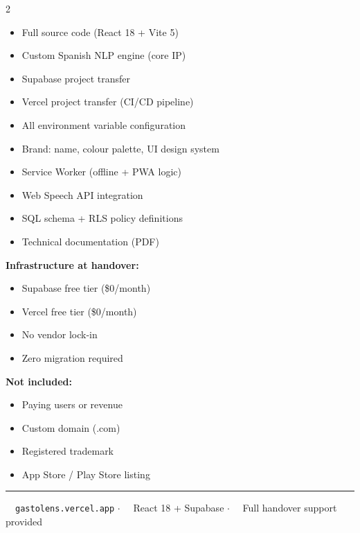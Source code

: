 \documentclass[a4paper,10pt]{article}
\begin{document}
\begin{multicols}{2}

{\small
\begin{itemize}[leftmargin=*,itemsep=2pt,parsep=0pt,topsep=2pt]
  \item[\color{ngreen}\faCheck] Full source code (React 18 + Vite 5)
  \item[\color{ngreen}\faCheck] Custom Spanish NLP engine (core IP)
  \item[\color{ngreen}\faCheck] Supabase project transfer
  \item[\color{ngreen}\faCheck] Vercel project transfer (CI/CD pipeline)
  \item[\color{ngreen}\faCheck] All environment variable configuration
  \item[\color{ngreen}\faCheck] Brand: name, colour palette, UI design system
  \item[\color{ngreen}\faCheck] Service Worker (offline + PWA logic)
  \item[\color{ngreen}\faCheck] Web Speech API integration
  \item[\color{ngreen}\faCheck] SQL schema + RLS policy definitions
  \item[\color{ngreen}\faCheck] Technical documentation (PDF)
\end{itemize}
}

\columnbreak

{\small
\textbf{\color{ncyan}Infrastructure at handover:}

\begin{itemize}[leftmargin=*,itemsep=2pt,parsep=0pt,topsep=4pt]
  \item[$\bullet$] Supabase free tier (\$0/month)
  \item[$\bullet$] Vercel free tier (\$0/month)
  \item[$\bullet$] No vendor lock-in
  \item[$\bullet$] Zero migration required
\end{itemize}

\vspace{6pt}
\textbf{\color{ncyan}Not included:}

\begin{itemize}[leftmargin=*,itemsep=2pt,parsep=0pt,topsep=4pt]
  \item[\color{nred}\faTimes] Paying users or revenue
  \item[\color{nred}\faTimes] Custom domain (.com)
  \item[\color{nred}\faTimes] Registered trademark
  \item[\color{nred}\faTimes] App Store / Play Store listing
\end{itemize}
}

\end{multicols}

\vspace{8pt}
{\color{bdr2}\rule{\linewidth}{0.3pt}}
\vspace{5pt}

\begin{center}
{\small\color{tm}
  \faGlobe~~{\color{ncyan}\texttt{gastolens.vercel.app}}
  \quad$\cdot$\quad
  \faCode~~React 18 + Supabase
  \quad$\cdot$\quad
  \faClock~~Full handover support provided
}
\end{center}
\end{document}
